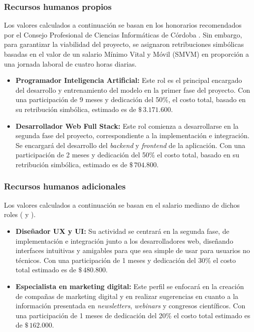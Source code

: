             \subsubsection*{Recursos humanos propios}
    
                Los valores calculados a continuación se basan en los honorarios recomendados por el Consejo Profesional de Ciencias Informáticas de Córdoba . Sin embargo, para garantizar la viabilidad del proyecto, se asignaron retribuciones simbólicas basadas en el valor de un salario Mínimo Vital y Móvil (SMVM)  en proporción a una jornada laboral de cuatro horas diarias.
                
                \begin{itemize}
                    \item \textbf{Programador Inteligencia Artificial:} Este rol es el principal encargado del desarrollo y entrenamiento del modelo en la primer fase del proyecto. Con una participación de 9 meses y dedicación del 50\%, el costo total, basado en su retribución simbólica, estimado es de $\$\,3.171.600$.
        
                    \item \textbf{Desarrollador Web Full Stack:} Este rol comienza a desarrollarse en la segunda fase del proyecto, correspondiente a la implementación e integración. Se encargará del desarrollo del \textit{backend} y \textit{frontend} de la aplicación. Con una participación de 2 meses y dedicación del 50\% el costo total, basado en su retribución simbólica, estimado es de $\$\,704.800$.
                \end{itemize}
    
            \subsubsection*{Recursos humanos adicionales}
                
                Los valores calculados a continuación se basan en el salario mediano de dichos roles ( y  ).
                
                \begin{itemize}
                    \item \textbf{Diseñador UX y UI:} Su actividad se centrará en la segunda fase, de implementación e integración junto a los desarrolladores web, diseñando interfaces intuitivas y amigables para que sea simple de usar para usuarios no técnicos. Con una participación de 1 meses y dedicación del 30\% el costo total estimado es de $\$\,480.800$.
        
                    \item \textbf{Especialista en marketing digital:} Este perfil se enfocará en la creación de compañas de marketing digital y en realizar sugerencias  en cuanto a la información presentada en \textit{newsletters}, \textit{webinars} y congresos científicos. Con una participación de 1 meses de dedicación del 20\% el costo total estimado es de $\$\,162.000$.
                \end{itemize}

